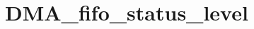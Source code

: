 \hypertarget{group___d_m_a__fifo__status__level}{\section{D\-M\-A\-\_\-fifo\-\_\-status\-\_\-level}
\label{group___d_m_a__fifo__status__level}
}
